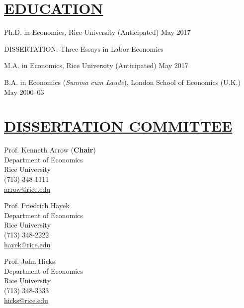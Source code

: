 \documentclass{res} %
\begin{document}
 

\thispagestyle{empty}
 


\address{  
\href{mailto:  dricardo@rice.edu}{ dricardo@rice.edu} \\ 
Department of Economics MS-22 \\
Rice University, Houston, TX 77251-1892\\
(713) 348-8411           
}
                        
\begin{resume}                         

\section{\scshape \underline{EDUCATION} }  
\vspace{6pt} 
\noindent Ph.D. in Economics, Rice University  \hfill (Anticipated) May 2017 \par
{\scshape DISSERTATION:} Three Essays in Labor Economics

\noindent M.A. in Economics, Rice University  \hfill (Anticipated) May 2017 \par
  
\noindent B.A. in Economics (\emph{Summa cum Laude}), London School of Economics (U.K.)  \hfill    May 2000--03 \par

\vspace{-.2cm}
\section{\scshape \underline{DISSERTATION COMMITTEE}}
\vspace{6pt} 
\begin{minipage}[t]{0.5\textwidth}
\noindent Prof. Kenneth Arrow ({\bf Chair}) \\
Department of Economics \\
Rice University \\
(713) 348-1111\\
\href{mailto:  arrow@rice.edu}{ arrow@rice.edu}

\vspace{.2cm}

Prof. Friedrich Hayek \\
Department of Economics \\
Rice University \\
(713) 348-2222\\
\href{mailto:  hayek@rice.edu}{hayek@rice.edu}\\
\end{minipage}%
\begin{minipage}[t]{0.5\textwidth}
Prof. John Hicks \\
Department of Economics\\
Rice University \\
(713) 348-3333 \\
\href{mailto:  hicks@rice.edu}{hicks@rice.edu}\\
\end{minipage}



\end{resume}
\end{document}
